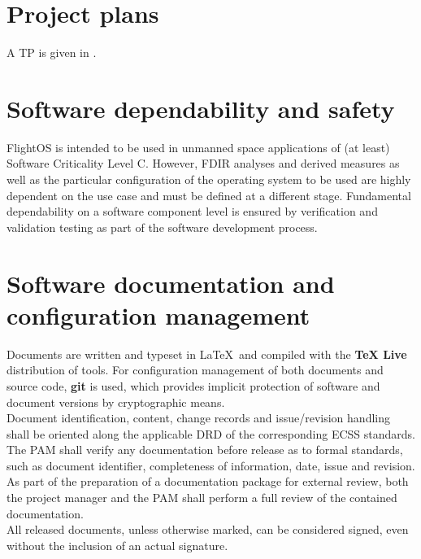 \section{Project plans}

A \glsdesc{TP} is given in \cite{flightosTP}.


\section{Software dependability and safety}

FlightOS is intended to be used in unmanned space
applications of (at least) Software Criticality Level C. However, \gls{FDIR}
analyses and derived measures as well as the particular configuration of
the operating system to be used are highly dependent on the use case and must
be defined at a different stage. Fundamental dependability on a software
component level is ensured by verification and validation testing as part of the
software development process.


\section{Software documentation and configuration management}

Documents are written and typeset in \LaTeX\ and compiled with the \textbf{TeX Live}
distribution of tools. For configuration management of both documents and source
code, \textbf{git} is used, which provides implicit protection of software and
document versions by cryptographic means.\\

\noindent
Document identification, content, change records and issue/revision handling
shall be oriented along the applicable \gls{DRD} of the corresponding ECSS
standards.\\

\noindent
The \gls{PAM} shall verify any documentation before release as to formal
standards, such as document identifier, completeness of information, date,
issue and revision.\\

\noindent
As part of the preparation of a documentation package for external review, both
the project manager and the \gls{PAM} shall perform a full review of the
contained documentation.\\

\noindent
All released documents, unless otherwise marked, can be considered signed, even
without the inclusion of an actual signature.\\

